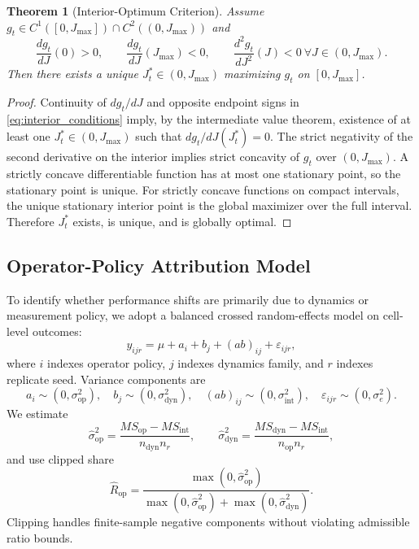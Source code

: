 \documentclass{article} %
\newtheorem{theorem}{Theorem}[section]
\begin{document}
\begin{theorem}[Interior-Optimum Criterion]
\label{thm:interior_optimum}
Assume $g_t\in C^1([0,J_{\max}])\cap C^2((0,J_{\max}))$ and
\begin{equation}
\frac{d g_t}{dJ}(0)>0,\qquad \frac{d g_t}{dJ}(J_{\max})<0,\qquad \frac{d^2 g_t}{dJ^2}(J)<0\ \forall J\in(0,J_{\max}).
\label{eq:interior_conditions}
\end{equation}
Then there exists a unique $J_t^*\in(0,J_{\max})$ maximizing $g_t$ on $[0,J_{\max}]$.
\end{theorem}
\begin{proof}
Continuity of $dg_t/dJ$ and opposite endpoint signs in \eqref{eq:interior_conditions} imply, by the intermediate value theorem, existence of at least one $J_t^*\in(0,J_{\max})$ such that $dg_t/dJ(J_t^*)=0$.
The strict negativity of the second derivative on the interior implies strict concavity of $g_t$ over $(0,J_{\max})$.
A strictly concave differentiable function has at most one stationary point, so the stationary point is unique.
For strictly concave functions on compact intervals, the unique stationary interior point is the global maximizer over the full interval.
Therefore $J_t^*$ exists, is unique, and is globally optimal.
\end{proof}

\subsection{Operator-Policy Attribution Model}
To identify whether performance shifts are primarily due to dynamics or measurement policy, we adopt a balanced crossed random-effects model on cell-level outcomes:
\begin{equation}
y_{ijr}=\mu+a_i+b_j+(ab)_{ij}+\varepsilon_{ijr},
\label{eq:anova_model}
\end{equation}
where $i$ indexes operator policy, $j$ indexes dynamics family, and $r$ indexes replicate seed. Variance components are
\begin{equation}
a_i\sim(0,\sigma_{\mathrm{op}}^2),\quad b_j\sim(0,\sigma_{\mathrm{dyn}}^2),\quad (ab)_{ij}\sim(0,\sigma_{\mathrm{int}}^2),\quad \varepsilon_{ijr}\sim(0,\sigma_e^2).
\label{eq:components}
\end{equation}
We estimate
\begin{equation}
\widehat{\sigma}_{\mathrm{op}}^2=\frac{MS_{\mathrm{op}}-MS_{\mathrm{int}}}{n_{\mathrm{dyn}}n_r},\qquad
\widehat{\sigma}_{\mathrm{dyn}}^2=\frac{MS_{\mathrm{dyn}}-MS_{\mathrm{int}}}{n_{\mathrm{op}}n_r},
\label{eq:ms_estimators}
\end{equation}
and use clipped share
\begin{equation}
\widehat{R}_{\mathrm{op}}=\frac{\max(0,\widehat{\sigma}_{\mathrm{op}}^2)}{\max(0,\widehat{\sigma}_{\mathrm{op}}^2)+\max(0,\widehat{\sigma}_{\mathrm{dyn}}^2)}.
\label{eq:rop_hat}
\end{equation}
Clipping handles finite-sample negative components without violating admissible ratio bounds.
\end{document}
